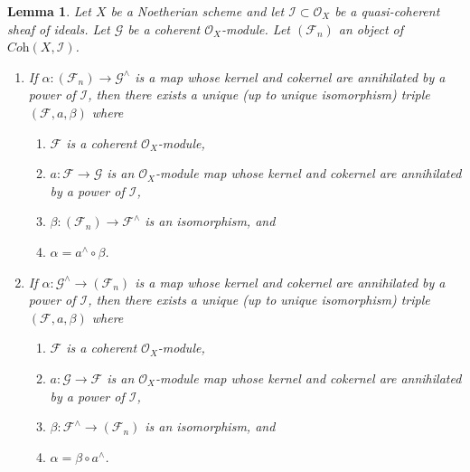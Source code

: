 \documentclass{stacks-project}
\theoremstyle{plain}
\newtheorem{lemma}[subsection]{Lemma}
\theoremstyle{definition}
\theoremstyle{remark}
\numberwithin{equation}{subsection}
\begin{document}
\begin{lemma}
\label{lemma-existence-easy}
Let $X$ be a Noetherian scheme and let $\mathcal{I} \subset \mathcal{O}_X$
be a quasi-coherent sheaf of ideals. Let $\mathcal{G}$ be a coherent
$\mathcal{O}_X$-module. Let $(\mathcal{F}_n)$ an object of
$\textit{Coh}(X, \mathcal{I})$.
\begin{enumerate}
\item If $\alpha : (\mathcal{F}_n) \to \mathcal{G}^\wedge$ is
a map whose kernel and cokernel are annihilated by a power of $\mathcal{I}$,
then there exists a unique (up to unique isomorphism) triple
$(\mathcal{F}, a, \beta)$ where
\begin{enumerate}
\item $\mathcal{F}$ is a coherent $\mathcal{O}_X$-module,
\item $a : \mathcal{F} \to \mathcal{G}$ is an $\mathcal{O}_X$-module map
whose kernel and cokernel are annihilated by a power of $\mathcal{I}$,
\item $\beta : (\mathcal{F}_n) \to \mathcal{F}^\wedge$ is an isomorphism, and
\item $\alpha = a^\wedge \circ \beta$.
\end{enumerate}
\item If $\alpha : \mathcal{G}^\wedge \to (\mathcal{F}_n)$ is
a map whose kernel and cokernel are annihilated by a power of $\mathcal{I}$,
then there exists a unique (up to unique isomorphism) triple
$(\mathcal{F}, a, \beta)$ where
\begin{enumerate}
\item $\mathcal{F}$ is a coherent $\mathcal{O}_X$-module,
\item $a : \mathcal{G} \to \mathcal{F}$ is an $\mathcal{O}_X$-module map
whose kernel and cokernel are annihilated by a power of $\mathcal{I}$,
\item $\beta : \mathcal{F}^\wedge \to (\mathcal{F}_n)$ is an isomorphism, and
\item $\alpha = \beta \circ a^\wedge$.
\end{enumerate}
\end{enumerate}
\end{lemma}
\end{document}
